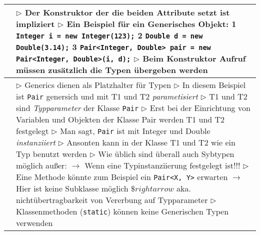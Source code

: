 \begin{table}[H]
\begin{tabular}{ | p{4cm} p{13.5cm} | }
	\makecell[l]{Beispiel: Aufruf} & 
	\makecell[l]
	{
	$\rhd$ Der Konstruktor der die beiden Attribute setzt ist impliziert \\
	$\rhd$ Ein Beispiel für ein Generisches Objekt: \\
	\hspace{0.5cm}  1 \hspace{0.4cm} \texttt{Integer i = new Integer(123);} \\
	\hspace{0.5cm}  2 \hspace{0.4cm} \texttt{Double d = new Double(3.14);} \\
	\hspace{0.5cm}  3 \hspace{0.4cm} \texttt{Pair<Integer, Double> pair = new Pair<Integer, Double>(i, d);} \\
	$\rhd$ Beim Konstruktor Aufruf müssen zusätzlich die Typen übergeben werden \\
	} 	\\ \hline


	\makecell[l]{Funktion} & 
	\makecell[l]
	{
	$\rhd$ Generics dienen als Platzhalter für Typen \\
	$\rhd$ In diesem Beispiel ist \texttt{Pair} genersich und mit T1 und T2 \textit{parametisiert} \\
	$\rhd$ T1 und T2 sind \textit{Typparameter} der Klasse \texttt{Pair} \\
	$\rhd$ Erst bei der Einrichtung von Variablen und Objekten der Klasse Pair \\
	\hspace{0.35cm} werden T1 und T2 festgelegt \\
	$\rhd$ Man sagt, \texttt{Pair} ist mit Integer und Double \textit{instanziiert} \\
	$\rhd$ Ansonten kann in der Klasse T1 und T2 wie ein Typ benutzt werden \\
	$\rhd$ Wie üblich sind überall auch Sybtypen möglich au\ss er: \\
	$\rightarrow$ Wenn eine Typinstanziierung festgelegt ist!!! \\
	$\rhd$ Eine Methode könnte zum Beispiel ein \texttt{Pair<X, Y>} erwarten \\
	$\rightarrow$ Hier ist keine Subklasse möglich \\
	$\$rightarrow$ aka. nichtübertragbarkeit von Vererbung auf Typparameter \\
	$\rhd$ Klassenmethoden (\texttt{static}) können keine Generischen Typen verwenden \\
	} 	\\ \hline



\end{tabular}
\end{table}
